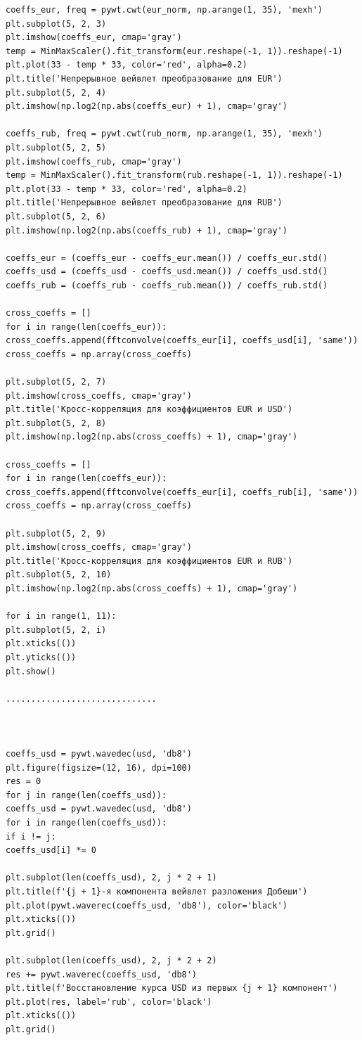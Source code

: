 \documentclass[a4paper]{article}
\begin{document}
\begin{lstlisting}[inputencoding={utf8}]
coeffs_eur, freq = pywt.cwt(eur_norm, np.arange(1, 35), 'mexh')
plt.subplot(5, 2, 3)
plt.imshow(coeffs_eur, cmap='gray')
temp = MinMaxScaler().fit_transform(eur.reshape(-1, 1)).reshape(-1)
plt.plot(33 - temp * 33, color='red', alpha=0.2)
plt.title('Непрерывное вейвлет преобразование для EUR')
plt.subplot(5, 2, 4)
plt.imshow(np.log2(np.abs(coeffs_eur) + 1), cmap='gray')

coeffs_rub, freq = pywt.cwt(rub_norm, np.arange(1, 35), 'mexh')
plt.subplot(5, 2, 5)
plt.imshow(coeffs_rub, cmap='gray')
temp = MinMaxScaler().fit_transform(rub.reshape(-1, 1)).reshape(-1)
plt.plot(33 - temp * 33, color='red', alpha=0.2)
plt.title('Непрерывное вейвлет преобразование для RUB')
plt.subplot(5, 2, 6)
plt.imshow(np.log2(np.abs(coeffs_rub) + 1), cmap='gray')

coeffs_eur = (coeffs_eur - coeffs_eur.mean()) / coeffs_eur.std()
coeffs_usd = (coeffs_usd - coeffs_usd.mean()) / coeffs_usd.std()
coeffs_rub = (coeffs_rub - coeffs_rub.mean()) / coeffs_rub.std()

cross_coeffs = []
for i in range(len(coeffs_eur)):
cross_coeffs.append(fftconvolve(coeffs_eur[i], coeffs_usd[i], 'same'))
cross_coeffs = np.array(cross_coeffs)

plt.subplot(5, 2, 7)
plt.imshow(cross_coeffs, cmap='gray')
plt.title('Кросс-корреляция для коэффициентов EUR и USD')
plt.subplot(5, 2, 8)
plt.imshow(np.log2(np.abs(cross_coeffs) + 1), cmap='gray')

cross_coeffs = []
for i in range(len(coeffs_eur)):
cross_coeffs.append(fftconvolve(coeffs_eur[i], coeffs_rub[i], 'same'))
cross_coeffs = np.array(cross_coeffs)

plt.subplot(5, 2, 9)
plt.imshow(cross_coeffs, cmap='gray')
plt.title('Кросс-корреляция для коэффициентов EUR и RUB')
plt.subplot(5, 2, 10)
plt.imshow(np.log2(np.abs(cross_coeffs) + 1), cmap='gray')

for i in range(1, 11):
plt.subplot(5, 2, i)
plt.xticks(())
plt.yticks(())
plt.show()

..............................



coeffs_usd = pywt.wavedec(usd, 'db8')
plt.figure(figsize=(12, 16), dpi=100)
res = 0
for j in range(len(coeffs_usd)):
coeffs_usd = pywt.wavedec(usd, 'db8')
for i in range(len(coeffs_usd)):
if i != j:
coeffs_usd[i] *= 0

plt.subplot(len(coeffs_usd), 2, j * 2 + 1)
plt.title(f'{j + 1}-я компонента вейвлет разложения Добеши')
plt.plot(pywt.waverec(coeffs_usd, 'db8'), color='black')
plt.xticks(())
plt.grid()

plt.subplot(len(coeffs_usd), 2, j * 2 + 2)
res += pywt.waverec(coeffs_usd, 'db8')
plt.title(f'Восстановление курса USD из первых {j + 1} компонент')
plt.plot(res, label='rub', color='black')
plt.xticks(())
plt.grid()

	\end{lstlisting}
	
	\newpage
	
	
\end{document}
